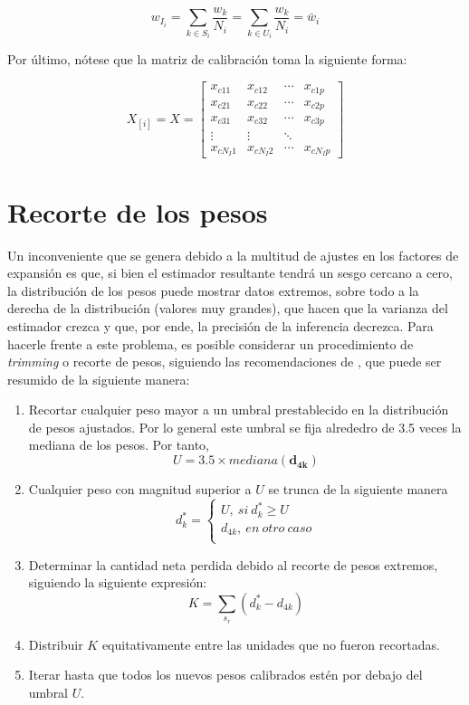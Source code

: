 \documentclass[
  10pt,
  spanish,
]{book}
\providecommand{\tightlist}{%
  \setlength{\itemsep}{0pt}\setlength{\parskip}{0pt}}
\begin{document}
\[
w_{I_i}=\sum_{k\in S_i}\frac{w_k}{N_i}=\sum_{k\in U_i}\frac{w_k}{N_i}=\bar{w}_i
\]

Por último, nótese que la matriz de calibración toma la siguiente forma:

\[
X_{[i]}=X=
\begin{bmatrix}
x_{c11} & x_{c12} & \cdots & x_{c1p}\\
x_{c21} & x_{c22} & \cdots & x_{c2p}\\
x_{c31} & x_{c32} & \cdots & x_{c3p}\\
\vdots  & \vdots & \ddots &\\
x_{cN_I1} & x_{cN_I2} & \cdots & x_{cN_Ip}
\end{bmatrix}
\]

\hypertarget{recorte-de-los-pesos}{%
\section{Recorte de los pesos}\label{recorte-de-los-pesos}}

Un inconveniente que se genera debido a la multitud de ajustes en los factores de expansión es que, si bien el estimador resultante tendrá un sesgo cercano a cero, la distribución de los pesos puede mostrar datos extremos, sobre todo a la derecha de la distribución (valores muy grandes), que hacen que la varianza del estimador crezca y que, por ende, la precisión de la inferencia decrezca. Para hacerle frente a este problema, es posible considerar un procedimiento de \emph{trimming} o recorte de pesos, siguiendo las recomendaciones de \citet[sec.~14.4]{Valliant_Dever_Kreuter_2018}, que puede ser resumido de la siguiente manera:

\begin{enumerate}
\def\labelenumi{\arabic{enumi}.}
\tightlist
\item
  Recortar cualquier peso mayor a un umbral prestablecido en la distribución de pesos ajustados. Por lo general este umbral se fija alrededro de 3.5 veces la mediana de los pesos. Por tanto,
  \[
  U=3.5\times mediana(\mathbf{d_{4k}})
  \]
\item
  Cualquier peso con magnitud superior a \(U\) se trunca de la siguiente manera
  \[
  d_k^\ast=\left\{\begin{matrix}U,\ si\ d_k^\ast\geq U\\
  d_{4k},\ en\ otro\ caso\\\end{matrix}\right.
  \]
\item
  Determinar la cantidad neta perdida debido al recorte de pesos extremos, siguiendo la siguiente expresión:
  \[
  K=\sum_{s_r}(d_k^\ast - d_{4k})
  \]
\item
  Distribuir \(K\) equitativamente entre las unidades que no fueron recortadas.
\item
  Iterar hasta que todos los nuevos pesos calibrados estén por debajo del umbral \(U\).
\end{enumerate}
\end{document}
